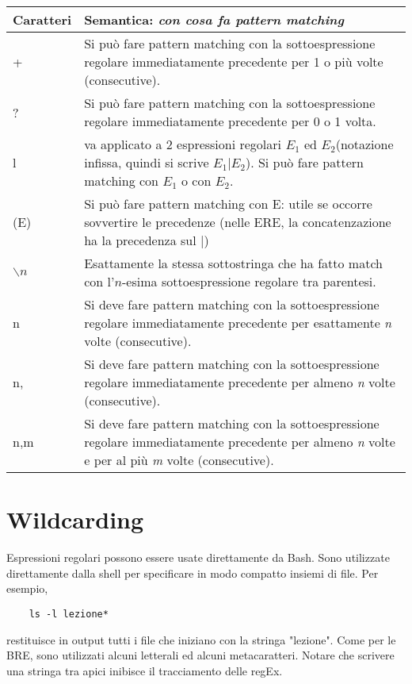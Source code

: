 \begin{center}
	 \label{tab:table-ere} 
	\begin{tabular}{|l|p{10cm}|}
	\hline
        \textbf{Caratteri} & \textbf{Semantica: \textit{con cosa fa pattern matching}} \\ \hline
		+		& Si può fare pattern matching con la sottoespressione regolare immediatamente precedente per 1 o più volte (consecutive). \\ \hline
		?		& Si può fare pattern matching con la sottoespressione regolare immediatamente precedente per 0 o 1 volta. \\ \hline
		l & va applicato a 2 espressioni regolari $ E_{1} $ ed $ E_{2} $(notazione infissa, quindi si scrive $ E_{1}|E_{2} $). Si può fare pattern matching con $ E_{1} $ o con $ E_{2} $. \\ \hline
		(E)		& Si può fare pattern matching con E: utile se occorre sovvertire le precedenze (nelle ERE, la concatenzazione ha la precedenza sul |) \\ \hline
		$ \backslash n $		& Esattamente la stessa sottostringa che ha fatto match con l'$ n $-esima sottoespressione regolare tra parentesi. \\ \hline
		{n}		& Si deve fare pattern matching con la sottoespressione regolare immediatamente precedente per esattamente \textit{n} volte (consecutive). \\ \hline
		{n,}		& Si deve fare pattern matching con la sottoespressione regolare immediatamente precedente per almeno \textit{n} volte (consecutive). \\ \hline
		{n,m}		& Si deve fare pattern matching con la sottoespressione regolare immediatamente precedente per almeno \textit{n} volte e per al più \textit{m} volte (consecutive). \\ \hline
	\end{tabular}		
\end{center}
\newpage

\section{Wildcarding}
Espressioni regolari possono essere usate direttamente da Bash. Sono utilizzate direttamente dalla shell per specificare in modo compatto insiemi di file. Per esempio,
\begin{lstlisting}
	ls -l lezione*
\end{lstlisting}
restituisce in output tutti i file che iniziano con la stringa "lezione".
Come per le BRE, sono utilizzati alcuni letterali ed alcuni metacaratteri.
Notare che scrivere una stringa tra apici inibisce il tracciamento delle regEx.

